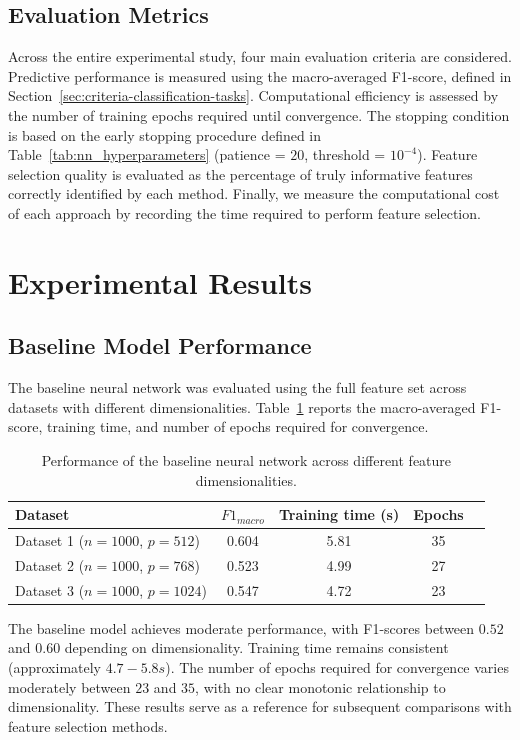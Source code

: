 \subsection{Evaluation Metrics}
Across the entire experimental study, four main evaluation criteria are considered. Predictive performance is measured using the macro-averaged F1-score, defined in Section~\ref{sec:criteria-classification-tasks}. Computational efficiency is assessed by the number of training epochs required until convergence. The stopping condition is based on the early stopping procedure defined in Table~\ref{tab:nn_hyperparameters} (patience = $20$, threshold = $10^{-4}$). Feature selection quality is evaluated as the percentage of truly informative features correctly identified by each method. Finally, we measure the computational cost of each approach by recording the time required to perform feature selection.

\section{Experimental Results}
\subsection{Baseline Model Performance}
The baseline neural network was evaluated using the full feature set across datasets with different dimensionalities. Table~\ref{tab:baseline_nn_results} reports the macro-averaged F1-score, training time, and number of epochs required for convergence.

\begin{table}[h]
\centering
\begin{tabular}{lcccc}
\hline
Dataset & $F1_{macro}$ & Training time (s) & Epochs \\
\hline
Dataset 1 ($n=1000$, $p=512$)  & 0.604 & 5.81 & 35 \\
Dataset 2 ($n=1000$, $p=768$)  & 0.523 & 4.99 & 27 \\
Dataset 3 ($n=1000$, $p=1024$) & 0.547 & 4.72 & 23 \\
\hline
\end{tabular}
\caption{Performance of the baseline neural network across different feature dimensionalities.}
\label{tab:baseline_nn_results}
\end{table}

The baseline model achieves moderate performance, with F1-scores between $0.52$ and $0.60$ depending on dimensionality. Training time remains consistent (approximately $4.7-5.8 s$). The number of epochs required for convergence varies moderately between $23$ and $35$, with no clear monotonic relationship to dimensionality. These results serve as a reference for subsequent comparisons with feature selection methods.

